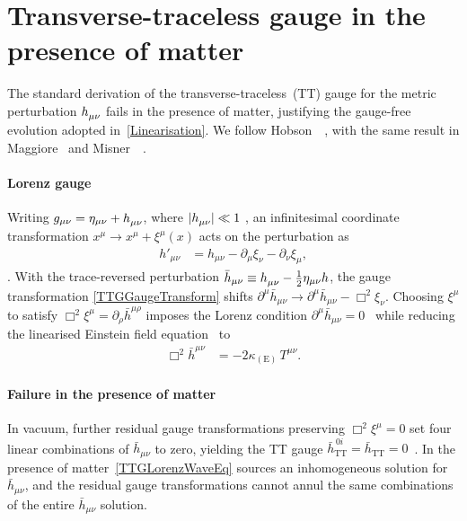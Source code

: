 
\section{Transverse-traceless gauge in the presence of matter}%
\label{TTGaugeAdmissibility}

The standard derivation of the
transverse-traceless~(TT) gauge for the metric perturbation
$\FieldH{_\mu_\nu}$ fails in the presence of matter,
justifying the gauge-free evolution adopted in~\cref{Linearisation}.
We follow Hobson~\etal~\cite[Ch.~17--18]{hobson2006general}, with the same result in
Maggiore~\cite[\S1.2]{maggiore2007gravitational} and Misner~\etal~\cite[Box~35.1]{misner1973gravitation}.

\paragraph*{Lorenz gauge}
Writing $g_{\mu\nu} = \eta_{\mu\nu} + \FieldH{_\mu_\nu}$, where $|\FieldH{_\mu_\nu}| \ll 1$
\cite[eq.~(17.1)]{hobson2006general}, an infinitesimal
coordinate transformation $x^{\mu}\to x^{\mu}+\xi^{\mu}(x)$ acts on
the perturbation as
\begin{align}
  h'_{\mu\nu} &= h_{\mu\nu}
    - \partial_{\mu}\xi_{\nu} - \partial_{\nu}\xi_{\mu} ,
  \label{TTGGaugeTransform}
\end{align}
\cite[eq.~(17.4)]{hobson2006general}. With the trace-reversed
perturbation
$\bar{h}_{\mu\nu}\equiv\FieldH{_\mu_\nu}-\tfrac{1}{2}\eta_{\mu\nu}h$,
the gauge transformation
\cref{TTGGaugeTransform} shifts
$\partial^{\mu}\bar{h}_{\mu\nu}\to\partial^{\mu}\bar{h}_{\mu\nu}-\Box^{2}\xi_{\nu}$.
Choosing $\xi^{\mu}$ to satisfy
$\Box^{2}\xi^{\mu}=\partial_{\rho}\bar{h}^{\mu\rho}$ imposes the
Lorenz condition $\partial^{\mu}\bar{h}_{\mu\nu}=0$~\cite[eq. (17.14)]{hobson2006general} while reducing the
linearised Einstein field
equation~\cite[eq.~(17.11)]{hobson2006general} to
\begin{align}
  \Box^{2}\bar{h}^{\mu\nu} &= -2\kappa_{(\mathrm{E})}\,T^{\mu\nu} .
  \label{TTGLorenzWaveEq}
\end{align}

\paragraph*{Failure in the presence of matter}
In vacuum, further residual
gauge transformations preserving $\Box^{2}\xi^{\mu}=0$ set four
linear combinations of $\bar{h}_{\mu\nu}$ to zero, yielding the TT
gauge $\bar{h}_{\mathrm{TT}}^{\,0i}=\bar{h}_{\mathrm{TT}}=0$~\cite[\S18.3,~eq.~(18.8)]{hobson2006general}.
In the presence of matter~\cref{TTGLorenzWaveEq} sources an
inhomogeneous solution for $\bar{h}_{\mu\nu}$, and the residual gauge
transformations cannot annul the same combinations of the entire
$\bar{h}_{\mu\nu}$ solution.

